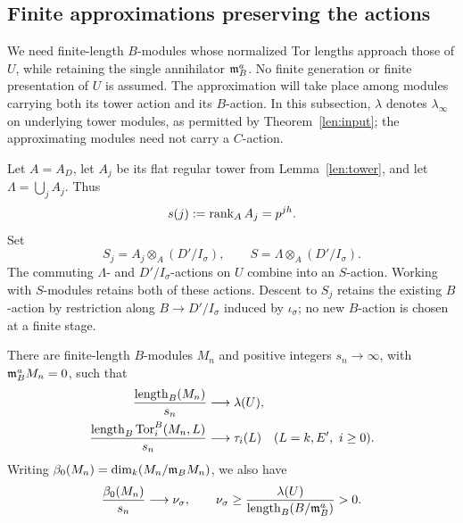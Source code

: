 \subsection{Finite approximations preserving the actions}

We need finite-length $B$-modules whose normalized Tor lengths approach
those of $U$, while retaining the single annihilator
$\mathfrak{m}_B^a$.  No finite generation or finite presentation of $U$ is
assumed.  The approximation will take place among modules carrying
both its tower action and its $B$-action.  In this subsection,
$\lambda$ denotes $\lambda_\infty$ on underlying tower modules,
as permitted by Theorem~\ref{len:input}; the approximating modules
need not carry a $C$-action.

Let $A=A_D$, let $A_j$ be its flat regular tower from
Lemma~\ref{len:tower}, and let $\Lambda=\bigcup_j A_j$.
Thus
\[
 s(j):=\operatorname{rank}_A A_j=p^{jh}.
\]
Set
\begin{equation}\label{pos:approximation-algebras}
 S_j=A_j\otimes_A(D'/I_\sigma),\qquad
 S=\Lambda\otimes_A(D'/I_\sigma).
\end{equation}
The commuting $\Lambda$- and $D'/I_\sigma$-actions on $U$ combine
into an $S$-action.  Working with $S$-modules retains both of these
actions.  Descent to $S_j$ retains the existing $B$-action by
restriction along $B\to D'/I_\sigma$ induced by $\iota_\sigma$;
no new $B$-action is chosen at a finite stage.

\begin{lemma}\label{pos:approximation}
There are finite-length $B$-modules $M_n$ and positive integers
$s_n\to\infty$, with $\mathfrak{m}_B^aM_n=0$, such that
\begin{align}
 \frac{\operatorname{length}_B(M_n)}{s_n}&\longrightarrow\lambda(U),
       \label{pos:approximation-length}\\
 \frac{\operatorname{length}_B\operatorname{Tor}_i^B(M_n,L)}{s_n}
       &\longrightarrow\tau_i(L)
       \quad(L=k,E',\ i\ge0).
       \label{pos:approximation-tor}
\end{align}
Writing $\beta_0(M_n)=\dim_k(M_n/\mathfrak{m}_BM_n)$, we also have
\begin{equation}\label{pos:generator-bound}
 \frac{\beta_0(M_n)}{s_n}\longrightarrow\nu_\sigma,
 \qquad
 \nu_\sigma\ge
 \frac{\lambda(U)}{\operatorname{length}_B(B/\mathfrak{m}_B^a)}>0.
\end{equation}
\end{lemma}

